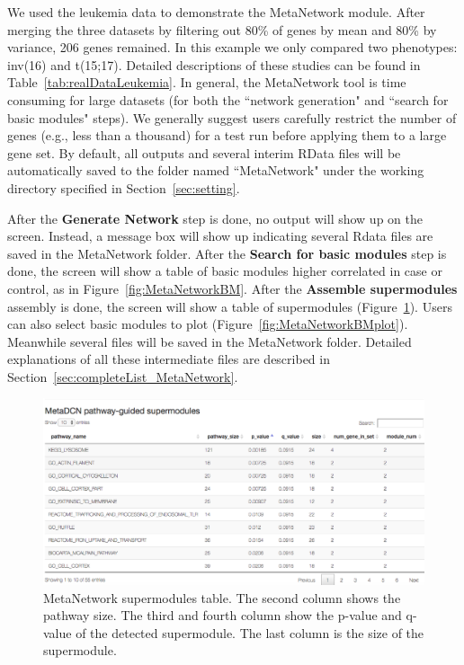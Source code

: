 We used the leukemia data to demonstrate the MetaNetwork module.
After merging the three datasets by filtering out 80\% of genes by mean and 80\% by variance, 206 genes remained.
In this example we only compared two phenotypes: inv(16) and t(15;17).
Detailed descriptions of these studies can be found in Table~\ref{tab:realDataLeukemia}. 
In general, the MetaNetwork tool is time consuming for large datasets (for both the ``network generation" and ``search for basic modules" steps).
We generally suggest users carefully restrict the number of genes 
(e.g., less than a thousand) for a test run before applying them to a large gene set.
By default, all outputs and several interim RData files will be automatically saved to the folder named ``MetaNetwork" under the working directory specified in Section~\ref{sec:setting}.




After the  \textbf{Generate Network} step is done, 
no output will show up on the screen. Instead, a message box will show up indicating several Rdata files are saved in the MetaNetwork folder. 
After the \textbf{Search for basic modules} step is done, the screen will show a table of basic modules higher correlated in case or control, 
as in Figure~\ref{fig:MetaNetworkBM}. 
After the \textbf{Assemble supermodules} assembly is done, 
the screen will show a table of supermodules (Figure~\ref{fig:MetaNetworksuper}). 
Users can also select basic modules to plot (Figure~\ref{fig:MetaNetworkBMplot}). 
Meanwhile several files will be saved in the MetaNetwork folder.
Detailed explanations of all these intermediate files are described in Section~\ref{sec:completeList_MetaNetwork}.

\begin{figure}[H]
\begin{center}
\includegraphics[scale=0.3]{./figure/MetaNetwork/MetaNetworksuper.png}
\caption{MetaNetwork supermodules table.
The second column shows the pathway size.
The third and fourth column show the p-value and q-value of the detected supermodule.
The last column is the size of the supermodule.
}
\label{fig:MetaNetworksuper}
\end{center}
\end{figure}

